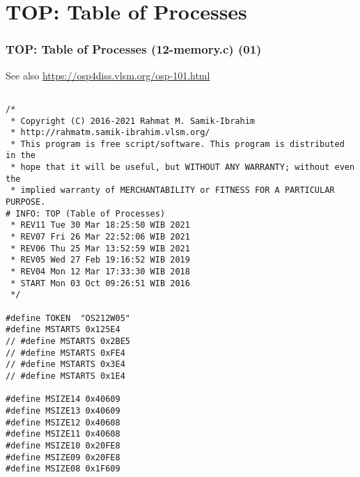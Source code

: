 \documentclass[xcolor=table, notheorems, hyperref={pdfpagelabels=false}]{beamer}
\begin{document}
\section{TOP: Table of Processes}
\begin{frame}[fragile]
\frametitle{TOP: Table of Processes (12-memory.c) (01)}

See also \url{https://osp4diss.vlsm.org/osp-101.html}

\begin{lstlisting}[basicstyle=\ttfamily\tiny]

/*
 * Copyright (C) 2016-2021 Rahmat M. Samik-Ibrahim
 * http://rahmatm.samik-ibrahim.vlsm.org/
 * This program is free script/software. This program is distributed in the 
 * hope that it will be useful, but WITHOUT ANY WARRANTY; without even the 
 * implied warranty of MERCHANTABILITY or FITNESS FOR A PARTICULAR PURPOSE.
# INFO: TOP (Table of Processes)
 * REV11 Tue 30 Mar 18:25:50 WIB 2021
 * REV07 Fri 26 Mar 22:52:06 WIB 2021
 * REV06 Thu 25 Mar 13:52:59 WIB 2021
 * REV05 Wed 27 Feb 19:16:52 WIB 2019
 * REV04 Mon 12 Mar 17:33:30 WIB 2018
 * START Mon 03 Oct 09:26:51 WIB 2016
 */

#define TOKEN  "OS212W05"
#define MSTARTS 0x125E4
// #define MSTARTS 0x2BE5
// #define MSTARTS 0xFE4
// #define MSTARTS 0x3E4
// #define MSTARTS 0x1E4

#define MSIZE14 0x40609
#define MSIZE13 0x40609
#define MSIZE12 0x40608
#define MSIZE11 0x40608
#define MSIZE10 0x20FE8
#define MSIZE09 0x20FE8
#define MSIZE08 0x1F609

\end{lstlisting}
\end{frame}
\end{document}
